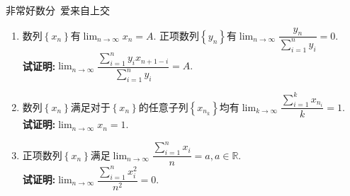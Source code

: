 \documentclass[a4paper,oneside]{ctexart}
\begin{document}
\pagestyle{empty}
\begin{center}\large 非常好数分\ 爱来自上交\end{center}
\begin{enumerate}[label=\textbf{\arabic*.},leftmargin=*]
    \item 数列$\left\{ x_n\right\}$有$\displaystyle\lim_{n\to\infty}{x_n}=A$.
          正项数列$\left\{ y_n\right\}$有$\displaystyle\lim_{n\to\infty}\dfrac{y_n}{\sum_{i=1}^{n}{y_i}}=0$.\\
          \textbf{试证明:}$\displaystyle\lim_{n\to\infty}{\dfrac{\sum_{i=1}^{n}{y_ix_{n+1-i}}}{\sum_{i=1}^{n}{y_i}}}=A.$
    \newpage
    \item 数列$\left\{ x_n\right\}$满足对于$\left\{ x_n\right\}$的任意子列$\left\{ x_{n_k}\right\}$均有$\displaystyle\lim_{k\to\infty}{\dfrac{\sum_{i=1}^{k}{x_{n_i}}}{k}}=1$.\\
          \textbf{试证明:}$\displaystyle\lim_{n\to\infty}{x_n}=1$.
    \newpage
    \item 正项数列$\left\{ x_n\right\}$满足$\displaystyle\lim_{n\to\infty}{\dfrac{\sum_{i=1}^{n}{x_i}}{n}}=a,a\in\mathbb{R}$.\\
          \textbf{试证明:}$\displaystyle\lim_{n\to\infty}{\dfrac{\sum_{i=1}^{n}{x_i^2}}{n^2}}=0$.
\end{enumerate}
\end{document}
